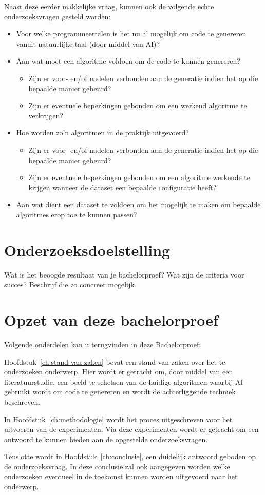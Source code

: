Naast deze eerder makkelijke vraag, kunnen ook de volgende echte onderzoeksvragen gesteld worden:
\begin{itemize}
	\item Voor welke programmeertalen is het nu al mogelijk om code te genereren vanuit natuurlijke taal (door middel van AI)?
	\item Aan wat moet een algoritme voldoen om de code te kunnen genereren?
	\begin{itemize}
		\item Zijn er voor- en/of nadelen verbonden aan de generatie indien het op die bepaalde manier gebeurd?
		\item Zijn er eventuele beperkingen gebonden om een werkend algoritme te verkrijgen?
	\end{itemize}
	\item Hoe worden zo'n algoritmen in de praktijk uitgevoerd?
	\begin{itemize}
		\item Zijn er voor- en/of nadelen verbonden aan de generatie indien het op die bepaalde manier gebeurd?
		\item Zijn er eventuele beperkingen gebonden om een algoritme werkende te krijgen wanneer de dataset een bepaalde configuratie heeft?
	\end{itemize}
	\item Aan wat dient een dataset te voldoen om het mogelijk te maken om bepaalde algoritmes erop toe te kunnen passen?
\end{itemize}

\section{Onderzoeksdoelstelling}
\label{sec:onderzoeksdoelstelling}

Wat is het beoogde resultaat van je bachelorproef? Wat zijn de criteria voor succes? Beschrijf die zo concreet mogelijk.

\section{Opzet van deze bachelorproef}
\label{sec:opzet-bachelorproef}

Volgende onderdelen kan u terugvinden in deze Bachelorproef:

Hoofdstuk~\ref{ch:stand-van-zaken} bevat een stand van zaken over het te onderzoeken onderwerp. Hier wordt er getracht om, door middel van een literatuurstudie, een beeld te schetsen van de huidige algoritmen waarbij AI gebruikt wordt om code te genereren en wordt de achterliggende techniek beschreven.

In Hoofdstuk~\ref{ch:methodologie} wordt het proces uitgeschreven voor het uitvoeren van de experimenten. Via deze experimenten wordt er getracht om een antwoord te kunnen bieden aan de opgestelde onderzoeksvragen.

Tenslotte wordt in Hoofdstuk~\ref{ch:conclusie}, een duidelijk antwoord geboden op de onderzoeksvraag. In deze conclusie zal ook aangegeven worden welke onderzoeken eventueel in de toekomst kunnen worden uitgevoerd naar het onderwerp.